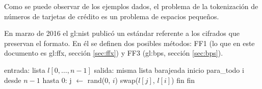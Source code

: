Como se puede observar de los ejemplos dados, el problema de la tokenización
de números de tarjetas de crédito es un problema de espacios pequeños.

En marzo de 2016 el \gls{gl:nist} publicó un estándar referente a los cifrados
que preservan el formato\cite{nist_fpe}. En él se definen dos posibles métodos:
FF1 (lo que en este documento es \gls{gl:ffx}, sección \ref{sec:ffx}) y FF3
(\gls{gl:bps}, sección \ref{sec:bps}).

\begin{pseudocodigo}[%
  caption={\textit{Knuth shuffle}, \cite{DBLP:books/aw/Knuth69}.},
  label={knuth_shuffle}%
]
    entrada: lista $ l[0, \dots, n - 1] $
    salida:  misma lista barajeada
    inicio
      para_todo i desde $ n - 1 $ hasta 0:
        j $ \gets $ rand($ 0 $, $ i $)
        swap($ l[j] $, $ l[i] $)
      fin
    fin
\end{pseudocodigo}
